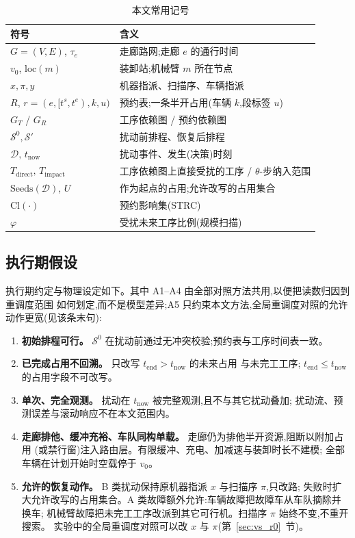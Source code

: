 \documentclass[manuscript,screen,review]{acmart}
\providecommand{\STRC}{\textsc{STRC}}
\begin{document}
\begin{table}[t]
\centering
\caption{本文常用记号}
\label{tab:notation}
\small
\begin{tabular}{@{}ll@{}}
\toprule
\textbf{符号} & \textbf{含义} \\
\midrule
\(G=(V,E)\), \(\tau_e\) & 走廊路网;走廊 \(e\) 的通行时间 \\
\(v_0\), \(\mathrm{loc}(m)\) & 装卸站;机械臂 \(m\) 所在节点 \\
\(x,\pi,y\) & 机器指派、扫描序、车辆指派 \\
\(R\), \(r=(e,[t^s,t^e),k,u)\) & 预约表;一条半开占用(车辆 \(k\),段标签 \(u\)) \\
\(G_T\) / \(G_R\) & 工序依赖图 / 预约依赖图 \\
\(\mathcal{S}^0,\mathcal{S}'\) & 扰动前排程、恢复后排程 \\
\(\mathcal{D},\,t_{\mathrm{now}}\) & 扰动事件、发生(决策)时刻 \\
\(T_{\mathrm{direct}},\,T_{\mathrm{impact}}\) & 工序依赖图上直接受扰的工序 / \(\theta\)-步纳入范围 \\
\(\mathrm{Seeds}(\mathcal{D})\), \(U\) & 作为起点的占用;允许改写的占用集合 \\
\(\mathrm{Cl}(\cdot)\) & 预约影响集(\STRC) \\
\(\varphi\) & 受扰未来工序比例(规模扫描) \\
\bottomrule
\end{tabular}
\end{table}

\subsection{执行期假设}
\label{sec:assumptions}

执行期约定与物理设定如下。其中 A1--A4 由全部对照方法共用,以便把读数归因到重调度范围
如何划定,而不是模型差异;A5 只约束本文方法,全局重调度对照的允许动作更宽(见该条末句):

\begin{enumerate}[label=\textbf{A\arabic*.},leftmargin=*,topsep=2pt,itemsep=2pt]
\item \textbf{初始排程可行。} \(\mathcal{S}^0\) 在扰动前通过无冲突校验;预约表与工序时间表一致。
\item \textbf{已完成占用不回溯。} 只改写 \(t_{\mathrm{end}}>t_{\mathrm{now}}\) 的未来占用
与未完工工序; \(t_{\mathrm{end}}\le t_{\mathrm{now}}\) 的占用字段不可改写。
\item \textbf{单次、完全观测。} 扰动在 \(t_{\mathrm{now}}\) 被完整观测,且不与其它扰动叠加;
扰动流、预测误差与滚动响应不在本文范围内。
\item \textbf{走廊排他、缓冲充裕、车队同构单载。} 走廊仍为排他半开资源,阻断以附加占用
(或禁行窗)注入路由层。有限缓冲、充电、加减速与装卸时长不建模;
全部车辆在计划开始时空载停于 \(v_0\)。
\item \textbf{允许的恢复动作。} B 类扰动保持原机器指派 \(x\) 与扫描序 \(\pi\),只改路;
失败时扩大允许改写的占用集合。A 类故障额外允许:车辆故障把故障车从车队摘除并换车;
机械臂故障把未完工工序改派到其它可行机。扫描序 \(\pi\) 始终不变,不重开搜索。
实验中的全局重调度对照可以改 \(x\) 与 \(\pi\)(第~\ref{sec:vs_r0}~节)。
\end{enumerate}
\end{document}
